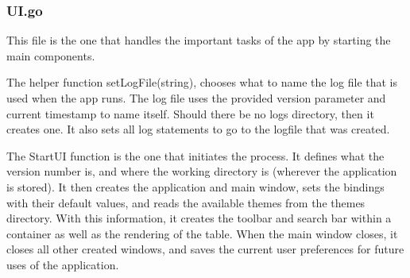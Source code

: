 \subsubsection{UI.go}
\label{subsubsec:UI}

This file is the one that handles the important tasks of the app by
starting the main components.

The helper function setLogFile(string), chooses what to name the log file
that is used when the app runs.
The log file uses the provided version parameter and current
timestamp to name itself. Should
there be no logs directory, then it creates one.
It also sets all log statements to go to the logfile that was created.

The StartUI function is the one that initiates the process. It
defines what the version number is, and where the working directory
is (wherever the application is stored).
It then creates the application and main window, sets the bindings
with their default values, and reads the available themes from the
themes directory.
With this information, it creates the toolbar and search bar within a
container as well as the rendering of the table.
When the main window closes, it closes all other created windows, and
saves the current user preferences for future uses of the application.
